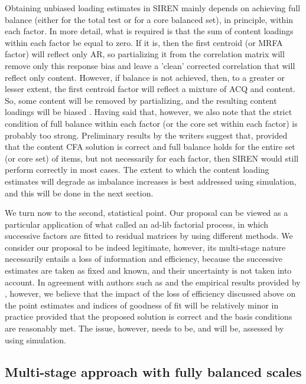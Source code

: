 Obtaining unbiased loading estimates in SIREN mainly depends on achieving full balance (either for the total test or for a core balanced set), in principle, within each factor. In more detail, what is required is that the sum of content loadings within each factor be equal to zero. If it is, then the first centroid (or MRFA factor) will reflect only AR, so partializing it from the correlation matrix will remove only this response bias and leave a 'clean' corrected correlation that will reflect only content. However, if balance is not achieved, then, to a greater or lesser extent, the first centroid factor will reflect a mixture of ACQ and content. So, some content will be removed by partializing, and the resulting content loadings will be biased \citep[see][]{tenBerge:1999}. Having said that, however, we also note that the strict condition of full balance within each factor (or the core set within each factor) is probably too strong. Preliminary results by the writers suggest that, provided that the content CFA solution is correct and full balance holds for the entire set (or core set) of items, but not necessarily for each factor, then SIREN would still perform correctly in most cases. The extent to which the content loading estimates will degrade as imbalance increases is best addressed using simulation, and this will be done in the next section.

We turn now to the second, statistical point. Our proposal can be viewed as a particular application of what \citep{Nunnally:1978} called an ad-lib factorial process, in which successive factors are fitted to residual matrices by using different methods. We consider our proposal to be indeed legitimate, however, its multi-stage nature necessarily entails a loss of information and efficiency, because the successive estimates are taken as fixed and known, and their uncertainty is not taken into account. In agreement with authors such as \citep{DeCastellarnau:2021, Nunnally:1978, tenBerge:1999} and the empirical results provided by \citep{Oberski:2013}, however, we believe that the impact of the loss of efficiency discussed above on the point estimates and indices of goodness of fit will be relatively minor in practice provided that the proposed solution is correct and the basis conditions are reasonably met. The issue, however, needs to be, and will be, assessed by using simulation.

\subsection{Multi-stage approach with fully balanced scales}

